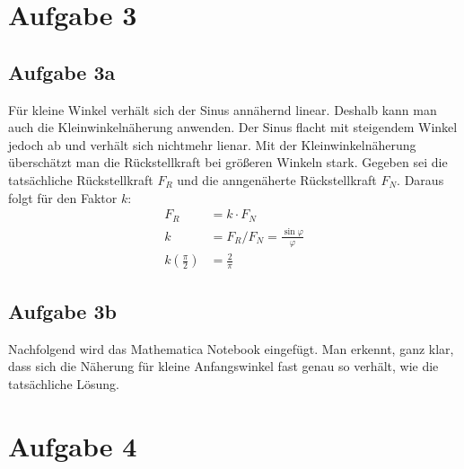 \documentclass[a4paper,10pt]{extarticle}
\begin{document}
\section*{Aufgabe 3}
\subsection*{Aufgabe 3a}
Für kleine Winkel verhält sich der Sinus annähernd linear. Deshalb kann man auch die Kleinwinkelnäherung anwenden. Der Sinus flacht mit steigendem Winkel jedoch ab und verhält sich nichtmehr lienar. Mit der Kleinwinkelnäherung überschätzt man die Rückstellkraft bei größeren Winkeln stark. Gegeben sei die tatsächliche Rückstellkraft $F_R$ und die anngenäherte Rückstellkraft $F_N$. Daraus folgt für den Faktor $k$:
\begin{align*}
  F_R &= k\cdot F_N\\
  k   &= F_R / F_N = \frac{\sin\varphi}{\varphi}\\
  k\left(\frac{\pi}{2}\right) &= \frac{2}{\pi}
\end{align*} 
\subsection*{Aufgabe 3b}
Nachfolgend wird das Mathematica Notebook eingefügt. Man erkennt, ganz klar, dass sich die Näherung für kleine Anfangswinkel fast genau so verhält, wie die tatsächliche Lösung.
  


\section*{Aufgabe 4}
\end{document}
